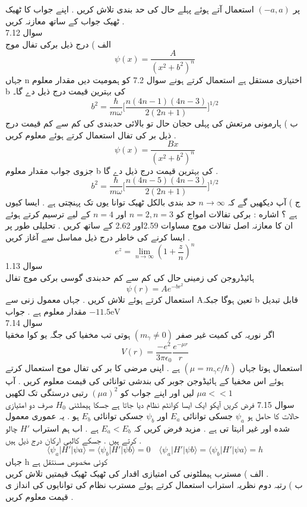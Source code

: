 پر
\((-a,a)\)
استعمال آتے ہوئے پہلے حال کی حد بندی تلاش کریں . اپنے جواب کا ٹھیک ٹھیک جواب کے ساتھ معازنہ کریں .\\
سوال 
7.12\\
الف ) درج ذیل برکی تفال موج 
\[\psi(x)=\frac{A}{(x^{2}+b^{2})^n}\]
جہاں n اختیاری مستقل ہے استعمال کرتے ہونے سوال 7.2 کو ہمومیت دیں مقدار معلوم b کی بہترین قیمت درج ذیل دے گا۔
\[b^{2}=\frac{\hbar}{m\omega}\big[\frac{n(4n-1)(4n-3)}{2(2n+1)}\big]^{1/2}\]
ب ) ہارمونی مرتعش کی پہلی حجان حال تو بالائی حدبندی کی کم سے کم قیمت درج ذیل بر کی تفال استعمال کرتے ہوئے معلوم کریں .
\[\psi(x)=\frac{Bx}{(x^{2}+b^{2})^n}\]
جزوی جواب مقدار معلوم b کی بہترین قیمت درج ذیل دے گا .
\[b^{2}=\frac{\hbar}{m\omega}\big[\frac{n(4n-5)(4n-3)}{2(2n+1)}\big]^{1/2}\]
ج ) آپ دیکھیں گے کہ
\( n\rightarrow \infty\)
حد بندی بالکل ٹھیک توانا یوں تک پہنچتی ہے . ایسا کیوں ہے ؟
اشاره : برکی تفالات امواج کو
\(n=2,n=3\)
اور
\(n=4\)
کے لیے ترسیم کرتے ہوئے ان کا معازنہ اصل تفالات موج مساوات 2.59اور 2.62 کے ساتھ کریں . تحلیلی طور پر ایسا کرنے کی خاطر درج ذیل مماسل سے آغاز کریں .
\[e^{z}=\lim_{n \to \infty}(1+\frac{z}{n})^{n}\]
سوال 
1.13\\
ہائیڈروجن کی زمینی حال کی کم سے کم حدبندی گوسی برکی موج تفال
\[\psi(r)=Ae^{-br^{2}}\]
استعمال کرتے ہوئے تلاش کریں . جہاں معمول زنی سے Aتعین ہوگا جبکہ b قابل تبدیل مقدار معلوم ہے . جواب
\(-11.5\text{eV}\)\\
سوال 
7.14\\
اگر نوریہ کی کمیت غیر صفر
\((m_{\gamma}\neq 0)\)
ہوتی تب مخفیا کی جگہ یو کوا مخقیا
\[V(r)=\frac{-e^{2}}{3\pi\epsilon_{0}}\frac{e^{-\mu r}}{r}\]
استعمال ہوتا جہاں
\((\mu=m_{\gamma}c/\hbar)\)
ہے . اپنی مرضی کا بر کی تفال موج استعمال کرتے ہوئے اس مخفيا کے ہائیڈوجن جوبر کی بندشی توانائی کی قیمت معلوم کریں . آپ
\(\mu a <<1\)
لیں اور اپنے جواب کو
\((\mu a)^{2}\)
رتبی درستگی تک لکھیں\\
سوال 7.15
فرض کریں آپکو ایک ایسا کوانٹم نظام دیا جاتا ہے جسکا ہیملٹنی
\(H_{0}\)
صرف دو امتیازی حالات کا حامل ہو
\(\psi_{a}\)
جسکی توانائی
\(E_{a}\)
اور
\(\psi_{b}\)
جسکی توانائی
\(E_{b}\)
ہو . یہ عموری معمول شده اور غیر انہتا تی ہے . مزید فرض کریں کہ
\(E_{a}<E_{b}\)
ہے . اب ہم استراب
\(H'\)
چالو کرتے ہیں . جسکے کالبی ارکان درج ذیل ہیں .
\[\langle \psi_{a}|H'|\psi{a}\rangle=\langle \psi_{b}|H'|\psi{b}\rangle=0\quad \langle \psi_{a}|H'|\psi{b}\rangle=\langle \psi_{b}|H'|\psi{a}\rangle=h\]
جہاں h کوئی مخصوص مسنتقل ہے\\
الف ) مسترب ہیملٹونی کی امتیازی اقدار کی ٹھیک ٹھیک قیمتیں تلاش کریں .\\
ب ) رتبہ دوم نظریہ استراب استعمال کرتے ہوئے مسترب نظام کی توانایوں کی انداز ی قیمت معلوم کریں .\\
